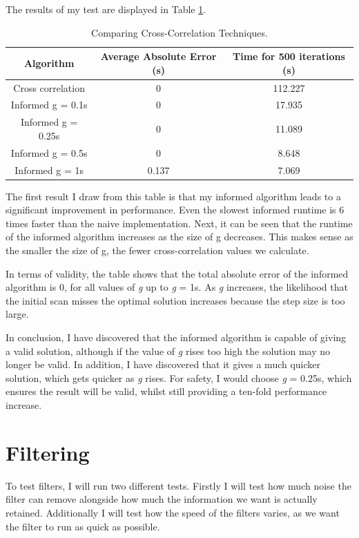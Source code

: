 \documentclass[12pt,a4paper,twoside,openright]{report}
\begin{document}
The results of my test are displayed in Table \ref{table:cross-correlation}. 

\begin{table}
\centering
\caption{Comparing Cross-Correlation Techniques.}
\label{table:cross-correlation}
\begin{tabular}{ | c | c | c | }
	\hline
	Algorithm & Average Absolute Error (s) & Time for 500
	iterations (s)\\ 
	\hline
	Cross correlation & 0 & 112.227 \\  
	Informed g = 0.1s & 0 & 17.935 \\    
	Informed g = 0.25s & 0 & 11.089 \\    
	Informed g = 0.5s & 0 & 8.648 \\    
	Informed g = 1s & 0.137 & 7.069  \\
	\hline
   \end{tabular}
\end{table}

The first result I draw from this table is that my informed algorithm leads to
a significant improvement in performance. Even the slowest informed runtime is 6
times faster than the naive implementation. Next, it can be seen that the
runtime of the informed algorithm increases as the size of g decreases. This
makes sense as the smaller the size of g, the fewer cross-correlation values
we calculate.

In terms of validity, the table shows that the total absolute error of the
informed algorithm is 0, for all values of \emph{g} up to \emph{g} = 1s. As
\emph{g} increases, the likelihood that the initial scan misses the optimal
solution increases because the step size is too large. 

In conclusion, I have discovered that the informed algorithm is capable of
giving a valid solution, although if the value of \emph{g} rises too high the
solution may no longer be valid. In addition, I have discovered that it gives
a much quicker solution, which gets quicker as \emph{g} rises. For safety, I
would choose \emph{g} = 0.25s, which ensures the result will be valid, whilst
still providing a ten-fold performance increase.


\section{Filtering}

To test filters, I will run two different tests. Firstly I will test how much
noise the filter can remove alongside how much the information we want is
actually retained. Additionally
I will test how the speed of the filters
varies, as we want the filter to run as quick as possible.
\end{document}
